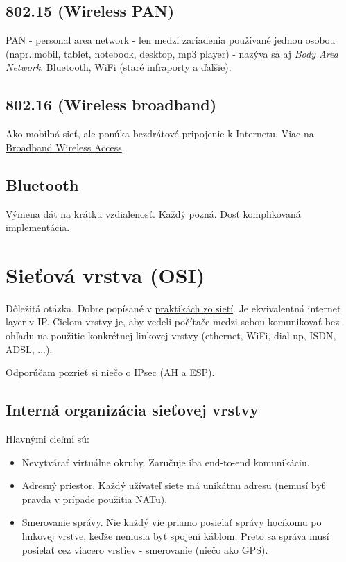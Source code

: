 \documentclass[10pt,a4paper]{article}
\begin{document}
\subsection{802.15 (Wireless PAN)} 
PAN - personal area network - len medzi zariadenia používané jednou osobou (napr.:mobil, tablet, notebook, desktop, mp3 player) - nazýva sa aj \emph{Body Area Network}.
Bluetooth, WiFi (staré infraporty a ďalšie). 
\subsection{802.16 (Wireless broadband)}
Ako mobilná sieť, ale ponúka bezdrátové pripojenie k Internetu.
Viac na \href{http://en.wikipedia.org/wiki/Broadband\_Wireless\_Access}{Broadband Wireless Access}. 
       
\subsection{Bluetooth}           
Výmena dát na krátku vzdialenosť. Každý pozná. 
Dosť komplikovaná implementácia. 
                                                 
\section{Sieťová vrstva (OSI)}     
Dôležitá otázka. Dobre popísané v \href{http://netlab.dcs.fmph.uniba.sk/siete/cviko3/}{praktikách zo sietí}. Je ekvivalentná internet layer v IP. 
Cieľom vrstvy je, aby vedeli počítače medzi sebou komunikovať bez ohľadu na použitie konkrétnej linkovej vrstvy (ethernet, WiFi, dial-up, ISDN, ADSL, ...). 
                 
Odporúčam pozrieť si niečo o \href{http://en.wikipedia.org/wiki/Ipsec}{IPsec} (AH a ESP).                  
                 
\subsection{Interná organizácia sieťovej vrstvy} 

Hlavnými cieľmi sú: 
\begin{itemize}
\item Nevytvárať virtuálne okruhy. Zaručuje iba end-to-end komunikáciu. 
\item Adresný priestor. Každý užívateľ siete má unikátnu adresu (nemusí byť pravda v prípade použitia NATu).  
\item Smerovanie správy. Nie každý vie priamo posielať správy hocikomu po linkovej vrstve, keďže nemusia byť spojení káblom. Preto sa správa musí posielať cez viacero vrstiev - smerovanie (niečo ako GPS). 
\end{itemize}
\end{document}
